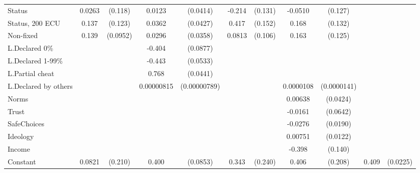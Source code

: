 {\begin{tabular}{l*{5}{cc}}
Status          &   0.0263         &  (0.118)&   0.0123         & (0.0414)&   -0.214         &  (0.131)&  -0.0510         &  (0.127)&                  &         \\
Status, 200 ECU &    0.137         &  (0.123)&   0.0362         & (0.0427)&    0.417\sym{***}&  (0.152)&    0.168         &  (0.132)&                  &         \\
Non-fixed       &    0.139         & (0.0952)&   0.0296         & (0.0358)&   0.0813         &  (0.106)&    0.163         &  (0.125)&                  &         \\
L.Declared 0\%  &                  &         &   -0.404\sym{***}& (0.0877)&                  &         &                  &         &                  &         \\
L.Declared 1-99\%&                  &         &   -0.443\sym{***}& (0.0533)&                  &         &                  &         &                  &         \\
L.Partial cheat &                  &         &    0.768\sym{***}& (0.0441)&                  &         &                  &         &                  &         \\
L.Declared by others&                  &         &0.00000815         &(0.00000789)&                  &         &0.0000108         &(0.0000141)&                  &         \\
Norms           &                  &         &                  &         &                  &         &  0.00638         & (0.0424)&                  &         \\
Trust           &                  &         &                  &         &                  &         &  -0.0161         & (0.0642)&                  &         \\
SafeChoices     &                  &         &                  &         &                  &         &  -0.0276         & (0.0190)&                  &         \\
Ideology        &                  &         &                  &         &                  &         &  0.00751         & (0.0122)&                  &         \\
Income          &                  &         &                  &         &                  &         &   -0.398\sym{***}&  (0.140)&                  &         \\
Constant        &   0.0821         &  (0.210)&    0.400\sym{***}& (0.0853)&    0.343         &  (0.240)&    0.406\sym{*}  &  (0.208)&    0.409\sym{***}& (0.0225)\\

\end{tabular}}
